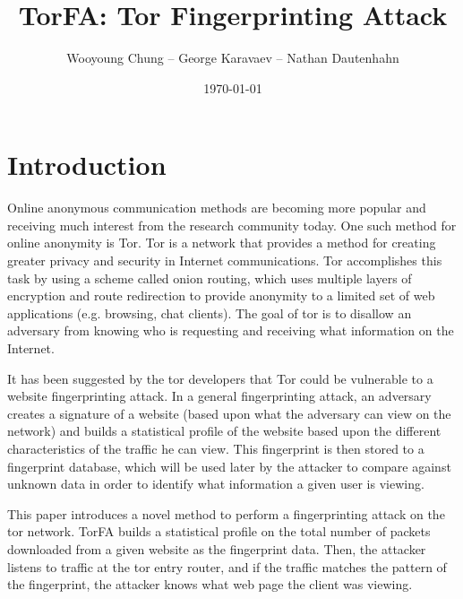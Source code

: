 \documentclass{article}
\title{TorFA: Tor Fingerprinting Attack}
\author{Wooyoung Chung -- George Karavaev -- Nathan Dautenhahn}
\date{\today}
\begin{document}
\maketitle
\setcounter{page}{1}
\newpage
{}
\pagestyle{fancy}
\chead{}
\tableofcontents 
\listoffigures 
\listoftables 
\newpage
{}
\setcounter{page}{1}

\section{Introduction}
Online anonymous communication methods are becoming more popular and receiving 
much interest from the research community today. One such method for online 
anonymity is Tor. Tor is a network that provides a method for creating greater 
privacy and security in Internet communications. Tor accomplishes this task 
by using a scheme called onion routing, which uses multiple layers of encryption
and route redirection to provide anonymity to a limited set of web applications 
(e.g. browsing, chat clients). The goal of tor is to disallow an adversary from 
knowing who is requesting and receiving what information on the Internet. 

It has been suggested by the tor developers%
that Tor could be vulnerable to a website fingerprinting 
attack. In a general fingerprinting attack, an adversary creates a signature of 
a website (based upon what the adversary can view on the network) and builds a 
statistical profile of the website based upon the different characteristics 
of the traffic he can view. This fingerprint is then stored to a fingerprint 
database, which will be used later by the attacker to compare against unknown 
data in order to identify what information a given user is 
viewing. 

This paper introduces a novel method to perform a fingerprinting attack on the 
tor network. TorFA builds a statistical profile on the total number of 
packets downloaded from a given website as the fingerprint data. Then, the 
attacker listens to traffic at the tor entry router, and if the traffic matches 
the pattern of the fingerprint, the attacker knows what web page the client was 
viewing.

\end{document}
